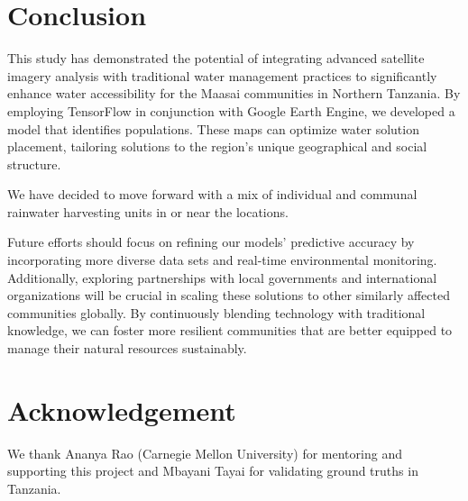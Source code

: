 \documentclass[10pt]{article}
\begin{document}
\section{Conclusion}

This study has demonstrated the potential of integrating advanced satellite imagery analysis with traditional water management practices to significantly enhance water accessibility for the Maasai communities in Northern Tanzania. By employing TensorFlow in conjunction with Google Earth Engine, we developed a model that identifies populations. These maps can optimize water solution placement, tailoring solutions to the region's unique geographical and social structure.

We have decided to move forward with a mix of individual and communal rainwater harvesting units in or near the locations.

Future efforts should focus on refining our models' predictive accuracy by incorporating more diverse data sets and real-time environmental monitoring. Additionally, exploring partnerships with local governments and international organizations will be crucial in scaling these solutions to other similarly affected communities globally. By continuously blending technology with traditional knowledge, we can foster more resilient communities that are better equipped to manage their natural resources sustainably.

\section*{Acknowledgement}

We thank Ananya Rao (Carnegie Mellon University) for mentoring and supporting this project and Mbayani Tayai for validating ground truths in Tanzania.

\printbibliography
\end{document}

